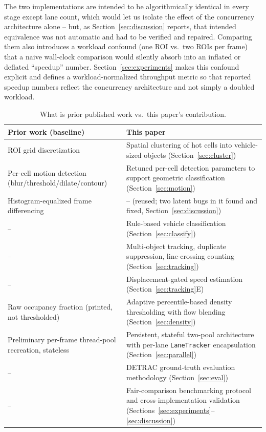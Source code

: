 \documentclass[conference]{IEEEtran}
\newcommand{\code}[1]{\texttt{#1}}
\begin{document}
The two implementations are intended to be algorithmically identical in
every stage except lane count, which would let us isolate the effect of
the concurrency architecture alone -- but, as Section~\ref{sec:discussion}
reports, that intended equivalence was not automatic and had to be
verified and repaired. Comparing them also introduces a workload
confound (one ROI vs.\ two ROIs per frame) that a naive wall-clock
comparison would silently absorb into an inflated or deflated
``speedup'' number. Section~\ref{sec:experiments} makes this confound
explicit and defines a workload-normalized throughput metric so that
reported speedup numbers reflect the concurrency architecture and not
simply a doubled workload.

\begin{table}[t]
\centering
\caption{What is prior published work \cite{baseline} vs.\ this
paper's contribution.}
\label{tab:baseline-vs-contribution}
\footnotesize
\begin{tabular}{p{3.9cm}p{3.6cm}}
\toprule
\textbf{Prior work \cite{baseline} (baseline)} & \textbf{This paper} \\
\midrule
ROI grid discretization &
Spatial clustering of hot cells into vehicle-sized objects
(Section~\ref{sec:cluster}) \\
Per-cell motion detection (blur/threshold/dilate/contour) &
Retuned per-cell detection parameters to support geometric classification
(Section~\ref{sec:motion}) \\
Histogram-equalized frame differencing &
-- (reused; two latent bugs in it found and fixed, Section~\ref{sec:discussion}) \\
-- &
Rule-based vehicle classification (Section~\ref{sec:classify}) \\
-- &
Multi-object tracking, duplicate suppression, line-crossing counting
(Section~\ref{sec:tracking}) \\
-- &
Displacement-gated speed estimation (Section~\ref{sec:tracking}E) \\
Raw occupancy fraction (printed, not thresholded) &
Adaptive percentile-based density thresholding with flow blending
(Section~\ref{sec:density}) \\
Preliminary per-frame thread-pool recreation, stateless &
Persistent, stateful two-pool architecture with per-lane
\code{LaneTracker} encapsulation (Section~\ref{sec:parallel}) \\
-- &
DETRAC ground-truth evaluation methodology (Section~\ref{sec:eval}) \\
-- &
Fair-comparison benchmarking protocol and cross-implementation
validation (Sections~\ref{sec:experiments}--\ref{sec:discussion}) \\
\bottomrule
\end{tabular}
\end{table}
\end{document}
